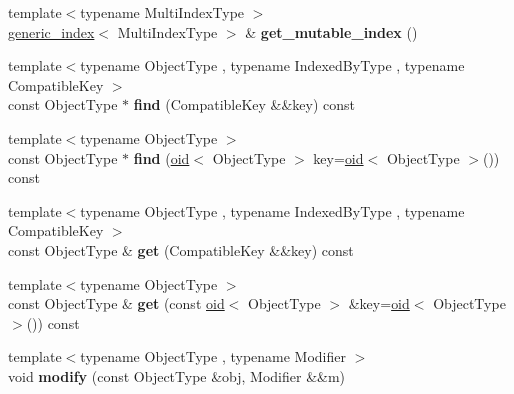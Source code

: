 \begin{DoxyCompactItemize}
\item 
\mbox{\label{classchainbase_1_1database_a0d0a5990ea7cbc07d4c3e6174a2dc3cc}} 
{\footnotesize template$<$typename Multi\+Index\+Type $>$ }\\\mbox{\hyperlink{classchainbase_1_1generic__index}{generic\+\_\+index}}$<$ Multi\+Index\+Type $>$ \& {\bfseries get\+\_\+mutable\+\_\+index} ()
\item 
\mbox{\label{classchainbase_1_1database_a03e1fe35fda2a7d1a09840c8b6c45af5}} 
{\footnotesize template$<$typename Object\+Type , typename Indexed\+By\+Type , typename Compatible\+Key $>$ }\\const Object\+Type $\ast$ {\bfseries find} (Compatible\+Key \&\&key) const
\item 
\mbox{\label{classchainbase_1_1database_ae5882723dd217f6ff32878966ee56852}} 
{\footnotesize template$<$typename Object\+Type $>$ }\\const Object\+Type $\ast$ {\bfseries find} (\mbox{\hyperlink{classchainbase_1_1oid}{oid}}$<$ Object\+Type $>$ key=\mbox{\hyperlink{classchainbase_1_1oid}{oid}}$<$ Object\+Type $>$()) const
\item 
\mbox{\label{classchainbase_1_1database_a5bec38a4d76b114f70a48eb32f10f9cf}} 
{\footnotesize template$<$typename Object\+Type , typename Indexed\+By\+Type , typename Compatible\+Key $>$ }\\const Object\+Type \& {\bfseries get} (Compatible\+Key \&\&key) const
\item 
\mbox{\label{classchainbase_1_1database_a35b9cae0f4c2d3fb3ccd26674007ea95}} 
{\footnotesize template$<$typename Object\+Type $>$ }\\const Object\+Type \& {\bfseries get} (const \mbox{\hyperlink{classchainbase_1_1oid}{oid}}$<$ Object\+Type $>$ \&key=\mbox{\hyperlink{classchainbase_1_1oid}{oid}}$<$ Object\+Type $>$()) const
\item 
\mbox{\label{classchainbase_1_1database_a9ebc006075e8fc2e84357a0e068b58d4}} 
{\footnotesize template$<$typename Object\+Type , typename Modifier $>$ }\\void {\bfseries modify} (const Object\+Type \&obj, Modifier \&\&m)

\end{DoxyCompactItemize}
